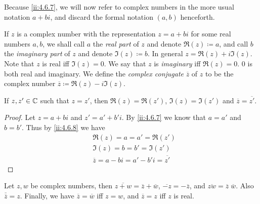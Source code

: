 \begin{note}
  Because \cref{ii:4.6.7}, we will now refer to complex numbers in the more usual notation \(a + bi\), and discard the formal notation \((a, b)\) henceforth.
\end{note}

\begin{defn}\label{ii:4.6.8}
  If \(z\) is a complex number with the representation \(z = a + bi\) for some real numbers \(a, b\), we shall call \(a\) the \emph{real part} of \(z\) and denote \(\Re(z) \coloneqq a\), and call \(b\) the \emph{imaginary part} of \(z\) and denote \(\Im(z) \coloneqq b\).
  In general \(z = \Re(z) + i \Im(z)\).
  Note that \(z\) is real iff \(\Im(z) = 0\).
  We say that \(z\) is \emph{imaginary} iff \(\Re(z) = 0\).
  \(0\) is both real and imaginary.
  We define the \emph{complex conjugate} \(\overline{z}\) of \(z\) to be the complex number \(\overline{z} \coloneqq \Re(z) - i \Im(z)\).
\end{defn}

\begin{ac}\label{ii:ac:4.6.4}
  If \(z, z' \in \mathbb{C}\) such that \(z = z'\), then \(\Re(z) = \Re(z')\), \(\Im(z) = \Im(z')\) and \(\overline{z} = \overline{z'}\).
\end{ac}

\begin{proof}
  Let \(z = a + bi\) and \(z' = a' + b' i\).
  By \cref{ii:4.6.7} we know that \(a = a'\) and \(b = b'\).
  Thus by \cref{ii:4.6.8} we have
  \begin{align*}
     & \Re(z) = a = a' = \Re(z')                         \\
     & \Im(z) = b = b' = \Im(z')                         \\
     & \overline{z} = a - bi = a' - b' i = \overline{z'}
  \end{align*}
\end{proof}

\begin{lem}\label{ii:4.6.9}
  Let \(z, w\) be complex numbers, then \(\overline{z + w} = \overline{z} + \overline{w}\), \(\overline{-z} = -\overline{z}\), and \(\overline{zw} = \overline{z} \; \overline{w}\).
  Also \(\overline{\overline{z}} = z\).
  Finally, we have \(\overline{z} = \overline{w}\) iff \(z = w\), and \(\overline{z} = z\) iff \(z\) is real.
\end{lem}

